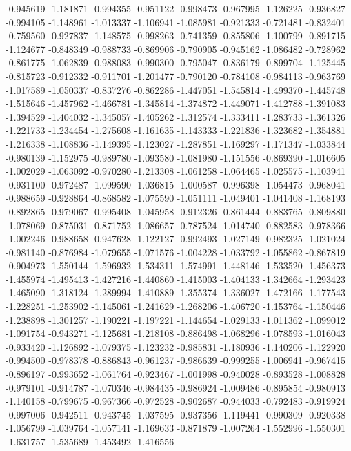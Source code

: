 -0.945619
-1.181871
-0.994355
-0.951122
-0.998473
-0.967995
-1.126225
-0.936827
-0.994105
-1.148961
-1.013337
-1.106941
-1.085981
-0.921333
-0.721481
-0.832401
-0.759560
-0.927837
-1.148575
-0.998263
-0.741359
-0.855806
-1.100799
-0.891715
-1.124677
-0.848349
-0.988733
-0.869906
-0.790905
-0.945162
-1.086482
-0.728962
-0.861775
-1.062839
-0.988083
-0.990300
-0.795047
-0.836179
-0.899704
-1.125445
-0.815723
-0.912332
-0.911701
-1.201477
-0.790120
-0.784108
-0.984113
-0.963769
-1.017589
-1.050337
-0.837276
-0.862286
-1.447051
-1.545814
-1.499370
-1.445748
-1.515646
-1.457962
-1.466781
-1.345814
-1.374872
-1.449071
-1.412788
-1.391083
-1.394529
-1.404032
-1.345057
-1.405262
-1.312574
-1.333411
-1.283733
-1.361326
-1.221733
-1.234454
-1.275608
-1.161635
-1.143333
-1.221836
-1.323682
-1.354881
-1.216338
-1.108836
-1.149395
-1.123027
-1.287851
-1.169297
-1.171347
-1.033844
-0.980139
-1.152975
-0.989780
-1.093580
-1.081980
-1.151556
-0.869390
-1.016605
-1.002029
-1.063092
-0.970280
-1.213308
-1.061258
-1.064465
-1.025575
-1.103941
-0.931100
-0.972487
-1.099590
-1.036815
-1.000587
-0.996398
-1.054473
-0.968041
-0.988659
-0.928864
-0.868582
-1.075590
-1.051111
-1.049401
-1.041408
-1.168193
-0.892865
-0.979067
-0.995408
-1.045958
-0.912326
-0.861444
-0.883765
-0.809880
-1.078069
-0.875031
-0.871752
-1.086657
-0.787524
-1.014740
-0.882583
-0.978366
-1.002246
-0.988658
-0.947628
-1.122127
-0.992493
-1.027149
-0.982325
-1.021024
-0.981140
-0.876984
-1.079655
-1.071576
-1.004228
-1.033792
-1.055862
-0.867819
-0.904973
-1.550144
-1.596932
-1.534311
-1.574991
-1.448146
-1.533520
-1.456373
-1.455974
-1.495413
-1.427216
-1.440860
-1.415003
-1.404133
-1.342664
-1.293423
-1.465090
-1.318124
-1.289994
-1.410889
-1.355374
-1.336027
-1.472166
-1.177543
-1.228251
-1.253902
-1.145061
-1.241629
-1.268206
-1.406720
-1.153764
-1.150446
-1.238898
-1.301257
-1.190221
-1.197221
-1.144654
-1.029133
-1.011362
-1.099012
-1.091754
-0.943271
-1.125681
-1.218108
-0.886498
-1.068296
-1.078593
-1.016043
-0.933420
-1.126892
-1.079375
-1.123232
-0.985831
-1.180936
-1.140206
-1.122920
-0.994500
-0.978378
-0.886843
-0.961237
-0.986639
-0.999255
-1.006941
-0.967415
-0.896197
-0.993652
-1.061764
-0.923467
-1.001998
-0.940028
-0.893528
-1.008828
-0.979101
-0.914787
-1.070346
-0.984435
-0.986924
-1.009486
-0.895854
-0.980913
-1.140158
-0.799675
-0.967366
-0.972528
-0.902687
-0.944033
-0.792483
-0.919924
-0.997006
-0.942511
-0.943745
-1.037595
-0.937356
-1.119441
-0.990309
-0.920338
-1.056799
-1.039764
-1.057141
-1.169633
-0.871879
-1.007264
-1.552996
-1.550301
-1.631757
-1.535689
-1.453492
-1.416556
